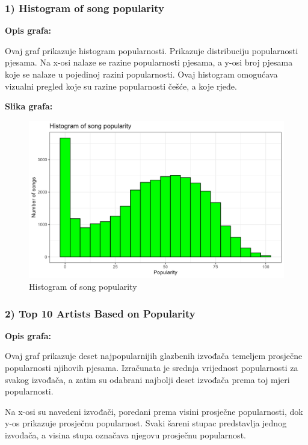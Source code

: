 	\subsubsection{1) Histogram of song popularity}
	
	\textbf{Opis grafa:}
	
	Ovaj graf prikazuje histogram popularnosti. Prikazuje distribuciju popularnosti pjesama. Na x-osi nalaze se razine popularnosti pjesama, a y-osi broj pjesama koje se nalaze u pojedinoj razini popularnosti.
	Ovaj histogram omogućava vizualni pregled koje su razine popularnosti češće, a koje rjeđe. 

	\textbf{Slika grafa:}
	\begin{figure}[H]
		\includegraphics[scale=0.9]{slike/Histogram of song popularity.png}
		\centering
		\caption{Histogram of song popularity}
		
	\end{figure}

	\subsubsection{2) Top 10 Artists Based on Popularity}
	
	\textbf{Opis grafa:}
	
	Ovaj graf prikazuje deset najpopularnijih glazbenih izvođača temeljem prosječne popularnosti njihovih pjesama. Izračunata je srednja vrijednost popularnosti za svakog izvođača, a zatim su odabrani najbolji deset izvođača prema toj mjeri popularnosti.
	
	Na x-osi su navedeni izvođači, poredani prema visini prosječne popularnosti, dok y-os prikazuje prosječnu popularnost. Svaki šareni stupac predstavlja jednog izvođača, a visina stupa označava njegovu prosječnu popularnost.
	

